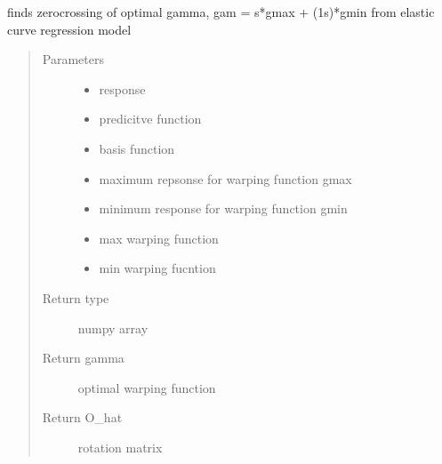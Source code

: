 \documentclass[letterpaper,10pt,english]{sphinxmanual}
\begin{document}

\begin{fulllineitems}
\label{\detokenize{curve_functions:curve_functions.curve_zero_crossing}}
finds zero\sphinxhyphen{}crossing of optimal gamma, gam = s*gmax + (1\sphinxhyphen{}s)*gmin
from elastic curve regression model
\begin{quote}\begin{description}
\item[{Parameters}] \leavevmode\begin{itemize}
\item {} 
 \textendash{} response

\item {} 
 \textendash{} predicitve function

\item {} 
 \textendash{} basis function

\item {} 
 \textendash{} maximum repsonse for warping function gmax

\item {} 
 \textendash{} minimum response for warping function gmin

\item {} 
 \textendash{} max warping function

\item {} 
 \textendash{} min warping fucntion

\end{itemize}

\item[{Return type}] \leavevmode
numpy array

\item[{Return gamma}] \leavevmode
optimal warping function

\item[{Return O\_hat}] \leavevmode
rotation matrix

\end{description}\end{quote}

\end{fulllineitems}
\end{document}
